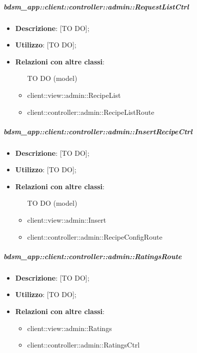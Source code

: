 		\subparagraph{bdsm\_app::client::controller::admin::RequestListCtrl} %
		\label{subp:bdsm_app_client_controller_admin_requestlistctrl}
			\begin{itemize}
				\item \textbf{Descrizione}: [TO DO];
				\item \textbf{Utilizzo}: [TO DO];
				\item \textbf{Relazioni con altre classi}:
					\begin{itemize}
						\item [TO DO] (model)
						\item client::view::admin::RecipeList
						\item client::controller::admin::RecipeListRoute
					\end{itemize}
			\end{itemize}

		\subparagraph{bdsm\_app::client::controller::admin::InsertRecipeCtrl} %
		\label{subp:bdsm_app_client_controller_admin_insertctrl}
			\begin{itemize}
				\item \textbf{Descrizione}: [TO DO];
				\item \textbf{Utilizzo}: [TO DO];
				\item \textbf{Relazioni con altre classi}:
					\begin{itemize}
						\item [TO DO] (model)
						\item client::view::admin::Insert
						\item client::controller::admin::RecipeConfigRoute
					\end{itemize}
			\end{itemize}

		\subparagraph{bdsm\_app::client::controller::admin::RatingsRoute} %
		\label{subp:bdsm_app_client_controller_admin_ratingsroute}
			\begin{itemize}
				\item \textbf{Descrizione}: [TO DO];
				\item \textbf{Utilizzo}: [TO DO];
				\item \textbf{Relazioni con altre classi}:
					\begin{itemize}
						\item client::view::admin::Ratings
						\item client::controller::admin::RatingsCtrl
					\end{itemize}
			\end{itemize}

